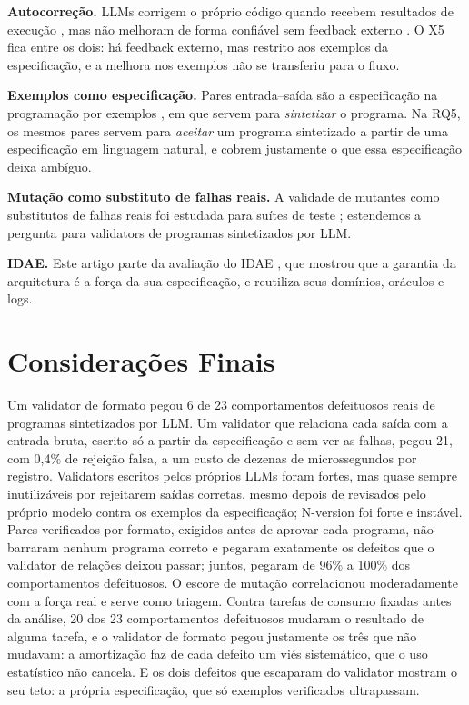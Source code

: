 \documentclass[sigconf,nonacm]{acmart}
\begin{document}
\textbf{Autocorreção.} LLMs corrigem o próprio código quando recebem resultados de execução \cite{chen2024selfdebug}, mas não melhoram de forma confiável sem feedback externo \cite{huang2024cannot}. O X5 fica entre os dois: há feedback externo, mas restrito aos exemplos da especificação, e a melhora nos exemplos não se transferiu para o fluxo.

\textbf{Exemplos como especificação.} Pares entrada--saída são a especificação na programação por exemplos \cite{gulwani2011flashfill}, em que servem para \textit{sintetizar} o programa. Na RQ5, os mesmos pares servem para \textit{aceitar} um programa sintetizado a partir de uma especificação em linguagem natural, e cobrem justamente o que essa especificação deixa ambíguo.

\textbf{Mutação como substituto de falhas reais.} A validade de mutantes como substitutos de falhas reais foi estudada para suítes de teste \cite{just2014mutants,jia2011mutation}; estendemos a pergunta para validators de programas sintetizados por LLM.

\textbf{IDAE.} Este artigo parte da avaliação do IDAE \cite{batista2026idae}, que mostrou que a garantia da arquitetura é a força da sua especificação, e reutiliza seus domínios, oráculos e logs.

\section{Considerações Finais}

Um validator de formato pegou 6 de 23 comportamentos defeituosos reais de programas sintetizados por LLM. Um validator que relaciona cada saída com a entrada bruta, escrito só a partir da especificação e sem ver as falhas, pegou 21, com 0,4\% de rejeição falsa, a um custo de dezenas de microssegundos por registro. Validators escritos pelos próprios LLMs foram fortes, mas quase sempre inutilizáveis por rejeitarem saídas corretas, mesmo depois de revisados pelo próprio modelo contra os exemplos da especificação; N-version foi forte e instável. Pares verificados por formato, exigidos antes de aprovar cada programa, não barraram nenhum programa correto e pegaram exatamente os defeitos que o validator de relações deixou passar; juntos, pegaram de 96\% a 100\% dos comportamentos defeituosos. O escore de mutação correlacionou moderadamente com a força real e serve como triagem. Contra tarefas de consumo fixadas antes da análise, 20 dos 23 comportamentos defeituosos mudaram o resultado de alguma tarefa, e o validator de formato pegou justamente os três que não mudavam: a amortização faz de cada defeito um viés sistemático, que o uso estatístico não cancela. E os dois defeitos que escaparam do validator mostram o seu teto: a própria especificação, que só exemplos verificados ultrapassam.
\end{document}
